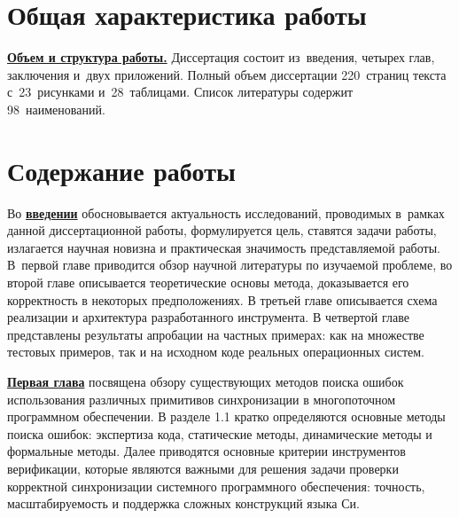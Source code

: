 
\section*{Общая характеристика работы}

\newcommand{\actuality}{\underline{\textbf{\actualityTXT}}}
\newcommand{\progress}{\underline{\textbf{\progressTXT}}}
\newcommand{\aim}{{\textbf\aimTXT}}
\newcommand{\aimandtasks}{\underline{{\textbf\aimandtasksTXT}}}
\newcommand{\tasks}{\textbf{\tasksTXT}}
\newcommand{\novelty}{\underline{\textbf{\noveltyTXT}}}
\newcommand{\influence}{\underline{\textbf{\influenceTXT}}}
\newcommand{\methods}{\underline{\textbf{\methodsTXT}}}
\newcommand{\defpositions}{\underline{\textbf{\defpositionsTXT}}}
\newcommand{\reliability}{\underline{\textbf{\reliabilityTXT}}}
\newcommand{\probation}{\underline{\textbf{\probationTXT}}}
\newcommand{\contribution}{\underline{\textbf{\contributionTXT}}}
\newcommand{\publications}{\underline{\textbf{\publicationsTXT}}}


\underline{\textbf{Объем и структура работы.}} Диссертация состоит из~введения, четырех глав, заключения и~двух приложений. Полный объем диссертации 220~страниц текста с~23~рисунками и~28~таблицами. Список литературы содержит 98~наименований.

\section*{Содержание работы}
Во \underline{\textbf{введении}} обосновывается актуальность
исследований, проводимых в~рамках данной диссертационной работы,
формулируется цель, ставятся задачи работы, излагается научная новизна
и практическая значимость представляемой работы.
В~первой главе приводится обзор научной литературы по изучаемой проблеме, во второй главе описывается теоретические основы метода, доказывается его корректность в некоторых предположениях.
В третьей главе описывается схема реализации и архитектура разработанного инструмента.
В четвертой главе представлены результаты апробации на частных примерах: как на множестве тестовых примеров, так и на исходном коде реальных операционных систем.

\underline{\textbf{Первая глава}} посвящена обзору существующих методов поиска ошибок использования различных примитивов синхронизации в многопоточном программном обеспечении.
В разделе 1.1 кратко определяются основные методы поиска ошибок: экспертиза кода, статические методы, динамические методы и формальные методы.
Далее приводятся основные критерии инструментов верификации, которые являются важными для решения задачи проверки корректной синхронизации системного программного обеспечения: точность, масштабируемость и поддержка сложных конструкций языка Си.

